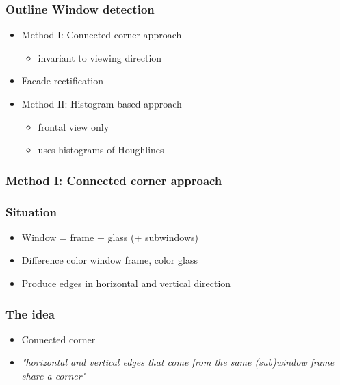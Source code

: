 \documentclass{beamer}
\begin{document}
\frame
{
	\frametitle{Outline Window detection}
	\begin{itemize}
	\item Method I: Connected corner approach 
		\begin{itemize}
		\item invariant to viewing direction
		\end{itemize}
	\item Facade rectification 
	\item Method II: Histogram based approach
		\begin{itemize}
		\item frontal view only
		\item uses histograms of Houghlines
		\end{itemize}
	\end{itemize}
}

\frame
{
	\frametitle{Method I: Connected corner approach}
}


\frame
{
	\frametitle{Situation}
	\begin{itemize}
	\item <+-| alert@+> Window = frame + glass (+ subwindows)
	\item <+-| alert@+> Difference color window frame, color glass
	\item <+-| alert@+> Produce edges in horizontal and vertical direction
	\end{itemize}
}


\frame
{
	\frametitle{The idea}
	\begin{itemize}
	\item <+-| alert@+> Connected corner
	\item <+-| alert@+> \emph{"horizontal and vertical edges that come from the same (sub)window frame share
	a corner"}
	\end{itemize}
}
\end{document}
